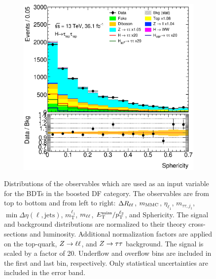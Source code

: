 \begin{figure}[htb]
\begin{subfigure}[t]{0.3\textwidth}
    \end{subfigure}
    \begin{subfigure}[t]{0.3\textwidth}
        \includegraphics[width=\textwidth]{./plots/mva/modeling/input_vars/BOOST_DF/ll-CutMVABoostedCatDF-Sphericity-lin.eps}
    \end{subfigure}
    \caption{Distributions of the observables which are used as an input variable for the BDTs in the boosted DF category.
             The observables are from top to bottom and from left to right: $\Delta R_{\ell\ell}$, $m_\text{MMC}$, $\eta_{\ell_1}$, $m_{\tau\tau,j_{1}}$,
             $\min \Delta \eta (\ell, \text{jets})$, $m_\text{T}^{\ell_1}$, $m_{\ell\ell}$, $E_\text{T}^\text{miss} / p_\text{T}^{\ell_2}$, and Sphericity.
             The signal and background distributions are normalized to their theory cross-sections and luminosity.
             Additional normalization factors are applied on the top-quark, $Z \to \ell \ell$, and $Z \to \tau \tau$ background.
             The signal is scaled by a factor of 20.
             Underflow and overflow bins are included in the first and last bin, respectively.
             Only statistical uncertainties are included in the error band.}\label{fig:mva:modeling:sr:boostdf}
\end{figure}

